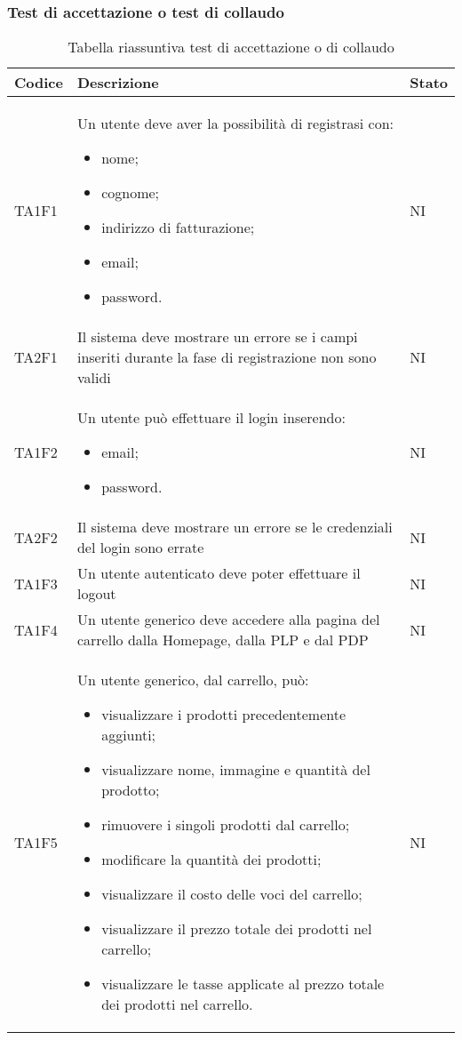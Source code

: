 \subsubsection{Test di accettazione o test di collaudo}
{

\centering
\renewcommand{\arraystretch}{2}
\begin{longtable}{C{3cm} C{10.2cm} C{1.5cm}}
\caption{Tabella riassuntiva test di accettazione o di collaudo}\\
\textbf{Codice} &
\textbf{Descrizione}&
\textbf{Stato}\\
\endhead


TA1F1 & Un utente deve aver la possibilità di registrasi con:
\begin{itemize}
	\item nome;
	\item cognome;
	\item indirizzo di fatturazione;
	\item email;
	\item password.
\end{itemize} & NI\\
TA2F1 & Il sistema deve mostrare un errore se
i campi inseriti durante la fase di registrazione non sono validi & NI\\
TA1F2 & Un utente può effettuare il login inserendo:
\begin{itemize}
	\item email;
	\item password.
\end{itemize} &  NI\\
TA2F2 & Il sistema deve mostrare un errore se le credenziali del login sono errate & NI\\
TA1F3 & Un utente autenticato deve poter effettuare il
logout & NI\\
TA1F4 & Un utente generico deve accedere alla pagina del carrello dalla Homepage, dalla PLP e dal PDP & NI\\
TA1F5 & Un utente generico, dal carrello, può:
\begin{itemize}
	\item visualizzare i prodotti precedentemente aggiunti;
	\item visualizzare nome, immagine e quantità del prodotto;
	\item rimuovere i singoli prodotti dal carrello;
	\item modificare la quantità dei prodotti;
	\item visualizzare il costo delle voci del carrello;
	\item visualizzare il prezzo totale dei prodotti nel carrello;
	\item visualizzare le tasse applicate al prezzo totale dei prodotti nel carrello.
\end{itemize}
& NI\\


\end{longtable}}
